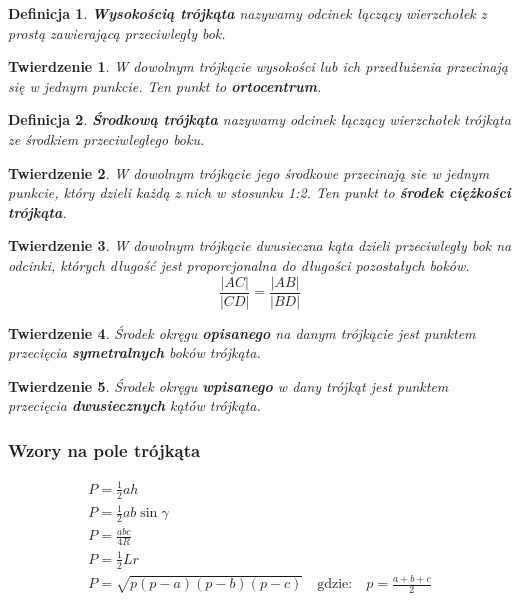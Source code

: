 \documentclass{article}
\numberwithin{equation}{section}
\newtheorem*{definition}{Definicja}
\newtheorem{theorem}{Twierdzenie}[section]
\begin{document}
      \begin{definition}
        \textbf{Wysokością trójkąta} nazywamy odcinek łączący wierzchołek z prostą zawierającą przeciwległy bok.
      \end{definition}
      \begin{theorem}
        W dowolnym trójkącie wysokości lub ich przedłużenia przecinają się w jednym punkcie. Ten punkt to \textbf{ortocentrum}.
      \end{theorem}
      \begin{definition}
        \textbf{Środkową trójkąta} nazywamy odcinek łączący wierzchołek trójkąta ze środkiem przeciwległego boku.
      \end{definition}
      \begin{theorem}
        W dowolnym trójkącie jego środkowe przecinają sie w jednym punkcie, który dzieli każdą z nich w stosunku 1:2. Ten punkt to \textbf{środek ciężkości trójkąta}.
      \end{theorem}
      \begin{theorem}
        W dowolnym trójkącie dwusieczna kąta dzieli przeciwległy bok na odcinki, których długość jest proporcjonalna do długości pozostałych boków.
        \begin{equation}
          \frac{|AC|}{|CD|} = \frac{|AB|}{|BD|}
        \end{equation}
      \end{theorem}
      \begin{theorem}
        Środek okręgu \textbf{opisanego} na danym trójkącie jest punktem przecięcia \textbf{symetralnych} boków trójkąta.
      \end{theorem}
      \begin{theorem}
        Środek okręgu \textbf{wpisanego} w dany trójkąt jest punktem przecięcia \textbf{dwusiecznych} kątów trójkąta.
      \end{theorem}
      \subsubsection{Wzory na pole trójkąta}
        \begin{gather}
          P = \frac 12ah\\
          P = \frac 12ab\sin\gamma\\
          P = \frac{abc}{4R}\\
          P = \frac 12Lr\\
          P = \sqrt{p(p-a)(p-b)(p-c)}\quad\text{gdzie:}\quad p = \frac{a+b+c}{2}
        \end{gather}
\end{document}

